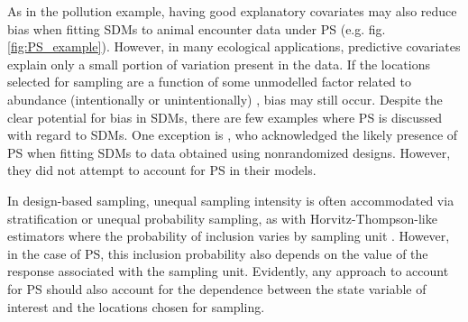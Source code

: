 \documentclass[times,mee,doublespace,]{besauth2}
\begin{document}
As in the pollution example, having good explanatory covariates may also reduce bias when fitting SDMs to animal encounter data under PS (e.g. fig. \ref{fig:PS_example}).  However, in many ecological applications, predictive covariates explain only a small portion of variation present in the data.  If the locations selected for sampling are a function of some unmodelled factor related to abundance (intentionally or unintentionally) , bias may still occur.  Despite the clear potential for bias in SDMs, there are few examples where PS \citep[\textit{sensu}][]{DiggleEtAl2010} is discussed with regard to SDMs.  One exception is
\citet{ChakrabortyEtAl2010}, who acknowledged the likely presence of PS when fitting SDMs to data obtained using nonrandomized designs.  However, they did not attempt to account for PS in their models.

In design-based sampling, unequal sampling intensity is often accommodated via stratification or unequal probability sampling, as with Horvitz-Thompson-like estimators where the probability of inclusion varies by sampling unit \citep{Cochran1977}.  However, in the case of PS, this inclusion probability also depends on the value of the response associated with the sampling unit.  Evidently, any approach to account for PS should also account for the dependence between the state variable of interest and the locations chosen for sampling.
\end{document}
